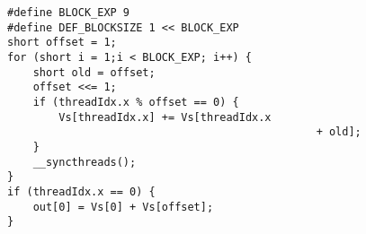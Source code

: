 \begin{footnotesize}
\begin{verbatim}
#define BLOCK_EXP 9
#define DEF_BLOCKSIZE 1 << BLOCK_EXP
short offset = 1;
for (short i = 1;i < BLOCK_EXP; i++) {
    short old = offset;
    offset <<= 1;
    if (threadIdx.x % offset == 0) {
        Vs[threadIdx.x] += Vs[threadIdx.x
        										+ old];
    }
    __syncthreads();
}
if (threadIdx.x == 0) {
    out[0] = Vs[0] + Vs[offset];
}
\end{verbatim}
\end{footnotesize}